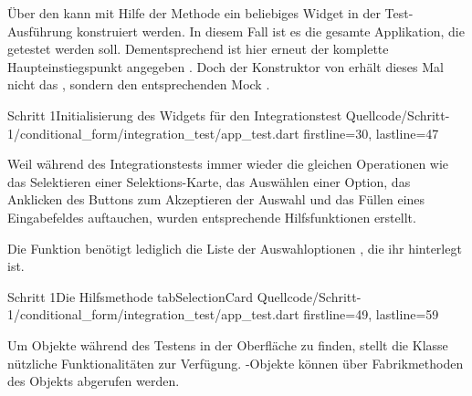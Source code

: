 Über den  kann mit Hilfe der Methode  ein beliebiges Widget in der Test-Ausführung konstruiert werden.
In diesem Fall ist es die gesamte Applikation, die getestet werden soll.
Dementsprechend ist  hier erneut der komplette Haupteinstiegspunkt angegeben \Lst{\ref{lst:Schritt1IntegrationsTestWidgetInitialisierung}}.
Doch der Konstruktor von  erhält dieses Mal nicht das , sondern den entsprechenden Mock . 

\begin{alexlisting}{Schritt 1}{Initialisierung des Widgets für den Integrationstest}
  {Quellcode/Schritt-1/conditional_form/integration_test/app_test.dart}
  {firstline=30, lastline=47}
  \label{lst:Schritt1IntegrationsTestWidgetInitialisierung}
\end{alexlisting}



Weil während des Integrationstests immer wieder die gleichen Operationen wie das Selektieren einer Selektions-Karte, das Auswählen einer Option, das Anklicken des Buttons zum Akzeptieren der Auswahl und das Füllen eines Eingabefeldes auftauchen, wurden entsprechende Hilfsfunktionen erstellt.


Die Funktion  \Lst{\ref{lst:Schritt1HilfsmethodeTabSelectionCard}} benötigt lediglich die Liste der Auswahloptionen , die ihr hinterlegt ist.
 

\begin{alexlisting}{Schritt 1}{Die Hilfsmethode tabSelectionCard}
  {Quellcode/Schritt-1/conditional_form/integration_test/app_test.dart}
  {firstline=49, lastline=59}
  \label{lst:Schritt1HilfsmethodeTabSelectionCard}
\end{alexlisting}

Um Objekte während des Testens in der Oberfläche zu finden, stellt die Klasse  nützliche Funktionalitäten zur Verfügung.
-Objekte können über Fabrikmethoden des Objekts  abgerufen werden.

